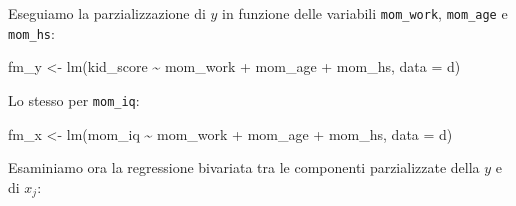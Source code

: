 \documentclass[
  11pt,
]{krantz}
\makeatletter
\newenvironment{Shaded}{\begin{snugshade}}{\end{snugshade}}
\newcommand{\AttributeTok}[1]{\textcolor[rgb]{0.61,0.61,0.61}{#1}}
\newcommand{\CommentTok}[1]{\textcolor[rgb]{0.37,0.37,0.37}{\textit{#1}}}
\newcommand{\FunctionTok}[1]{\textcolor[rgb]{0,0,0}{#1}}
\newcommand{\NormalTok}[1]{#1}
\newcommand{\OtherTok}[1]{\textcolor[rgb]{0.37,0.37,0.37}{#1}}
\newcommand{\SpecialCharTok}[1]{\textcolor[rgb]{0,0,0}{#1}}
\newenvironment{kframe}{%
\medskip{}
\setlength{\fboxsep}{.8em}
 \def\at@end@of@kframe{}%
 \ifinner\ifhmode%
  \def\at@end@of@kframe{\end{minipage}}%
  \begin{minipage}{\columnwidth}%
 \fi\fi%
 \def\FrameCommand##1{\hskip\@totalleftmargin \hskip-\fboxsep
 \colorbox{shadecolor}{##1}\hskip-\fboxsep
     \hskip-\linewidth \hskip-\@totalleftmargin \hskip\columnwidth}%
 \MakeFramed {\advance\hsize-\width
   \@totalleftmargin\z@ \linewidth\hsize
   \@setminipage}}%
 {\par\unskip\endMakeFramed%
 \at@end@of@kframe}
\renewenvironment{Shaded}{\begin{kframe}}{\end{kframe}}
\makeatother
\begin{document}
\begin{Shaded}
\end{Shaded}

Eseguiamo la parzializzazione di \(y\) in funzione delle variabili \texttt{mom\_work}, \texttt{mom\_age} e \texttt{mom\_hs}:

\begin{Shaded}
\begin{Highlighting}[]
\NormalTok{fm\_y }\OtherTok{\textless{}{-}} \FunctionTok{lm}\NormalTok{(kid\_score }\SpecialCharTok{\textasciitilde{}}\NormalTok{ mom\_work }\SpecialCharTok{+}\NormalTok{ mom\_age }\SpecialCharTok{+}\NormalTok{ mom\_hs, }\AttributeTok{data =}\NormalTok{ d)}
\end{Highlighting}
\end{Shaded}

Lo stesso per \texttt{mom\_iq}:

\begin{Shaded}
\begin{Highlighting}[]
\NormalTok{fm\_x }\OtherTok{\textless{}{-}} \FunctionTok{lm}\NormalTok{(mom\_iq }\SpecialCharTok{\textasciitilde{}}\NormalTok{ mom\_work }\SpecialCharTok{+}\NormalTok{ mom\_age }\SpecialCharTok{+}\NormalTok{ mom\_hs, }\AttributeTok{data =}\NormalTok{ d)}
\end{Highlighting}
\end{Shaded}

Esaminiamo ora la regressione bivariata tra le componenti parzializzate della \(y\) e di \(x_j\):

\begin{Shaded}
\end{Shaded}
\end{document}
